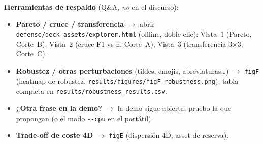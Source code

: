 \documentclass[11pt,a4paper]{article}
\begin{document}
\medskip
\noindent\textbf{Herramientas de respaldo} (Q\&A, \emph{no} en el discurso):
\begin{itemize}[leftmargin=1.4em,itemsep=2.5pt]
  \item \textbf{Pareto / cruce / transferencia} $\rightarrow$ abrir \texttt{defense/deck\_assets/explorer.html} (offline, doble clic): Vista~1 (Pareto, Corte~B), Vista~2 (cruce F1-vs-n, Corte~A), Vista~3 (transferencia 3$\times$3, Corte~C).
  \item \textbf{Robustez / otras perturbaciones} (tildes, emojis, abreviaturas\ldots) $\rightarrow$ \texttt{figF} (heatmap de robustez, \texttt{results/figures/figF\_robustness.png}); tabla completa en \texttt{results/robustness\_results.csv}.
  \item \textbf{¿Otra frase en la demo?} $\rightarrow$ la demo sigue abierta; pruebo la que propongan (o el modo \texttt{-{}-cpu} en el portátil).
  \item \textbf{Trade-off de coste 4D} $\rightarrow$ \texttt{figE} (dispersión 4D, asset de reserva).
\end{itemize}
\end{document}
